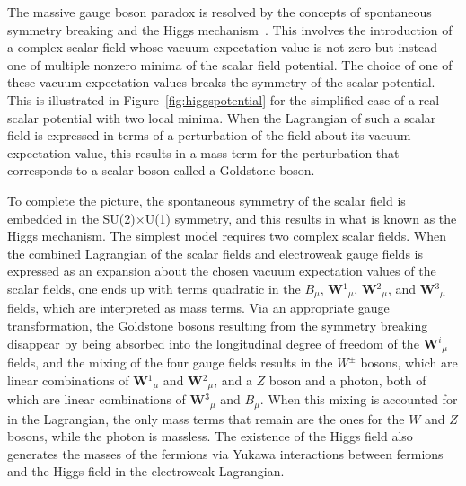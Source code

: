 The massive gauge boson paradox is resolved by the concepts of spontaneous symmetry breaking and the Higgs mechanism~\cite{ThomsonPhysics}. This involves the introduction of a complex scalar field whose vacuum expectation value is not zero but instead one of multiple nonzero minima of the scalar field potential. The choice of one of these vacuum expectation values breaks the symmetry of the scalar potential. This is illustrated in Figure~\ref{fig:higgspotential} for the simplified case of a real scalar potential with two local minima. When the Lagrangian of such a scalar field is expressed in terms of a perturbation of the field about its vacuum expectation value, this results in a mass term for the perturbation that corresponds to a scalar boson called a Goldstone boson.

To complete the picture, the spontaneous symmetry of the scalar field is embedded in the SU(2)$\times$U(1) symmetry, and this results in what is known as the Higgs mechanism. The simplest model requires two complex scalar fields. When the combined Lagrangian of the scalar fields and electroweak gauge fields is expressed as an expansion about the chosen vacuum expectation values of the scalar fields, one ends up with terms quadratic in the $B_{\mu}$, \textbf{W}$^1$$_{\mu}$, \textbf{W}$^2$$_{\mu}$, and \textbf{W}$^3$$_{\mu}$ fields, which are interpreted as mass terms. Via an appropriate gauge transformation, the Goldstone bosons resulting from the symmetry breaking disappear by being absorbed into the longitudinal degree of freedom of the \textbf{W}$^i$$_{\mu}$ fields, and the mixing of the four gauge fields results in the $W^{\pm}$ bosons, which are linear combinations of \textbf{W}$^1$$_{\mu}$ and \textbf{W}$^2$$_{\mu}$, and a $Z$ boson and a photon, both of which are linear combinations of \textbf{W}$^3$$_{\mu}$ and $B_{\mu}$. When this mixing is accounted for in the Lagrangian, the only mass terms that remain are the ones for the $W$ and $Z$ bosons, while the photon is massless. The existence of the Higgs field also generates the masses of the fermions via Yukawa interactions between fermions and the Higgs field in the electroweak Lagrangian.

